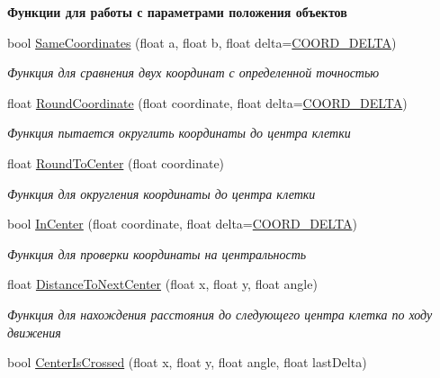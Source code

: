 \begin{Indent}\textbf{ Функции для работы с параметрами положения объектов}\par
\begin{DoxyCompactItemize}
\item 
bool \hyperlink{namespacertm_aa633b82b63b7cff4e9b08bf6a05ec383}{Same\+Coordinates} (float a, float b, float delta=\hyperlink{namespacertm_a9ae158a8873bdf59aa9872cdada6c657}{C\+O\+O\+R\+D\+\_\+\+D\+E\+L\+TA})
\begin{DoxyCompactList}\small\item\em Функция для сравнения двух координат с определенной точностью \end{DoxyCompactList}\item 
float \hyperlink{namespacertm_a511bf31b8bfc36474baaf915bc11a619}{Round\+Coordinate} (float coordinate, float delta=\hyperlink{namespacertm_a9ae158a8873bdf59aa9872cdada6c657}{C\+O\+O\+R\+D\+\_\+\+D\+E\+L\+TA})
\begin{DoxyCompactList}\small\item\em Функция пытается округлить координаты до центра клетки \end{DoxyCompactList}\item 
float \hyperlink{namespacertm_aa2d382c50aa6366b09deaa529d1b3199}{Round\+To\+Center} (float coordinate)
\begin{DoxyCompactList}\small\item\em Функция для округления координаты до центра клетки \end{DoxyCompactList}\item 
bool \hyperlink{namespacertm_a030416c27fb4a5896aad3d102083897f}{In\+Center} (float coordinate, float delta=\hyperlink{namespacertm_a9ae158a8873bdf59aa9872cdada6c657}{C\+O\+O\+R\+D\+\_\+\+D\+E\+L\+TA})
\begin{DoxyCompactList}\small\item\em Функция для проверки координаты на центральность \end{DoxyCompactList}\item 
float \hyperlink{namespacertm_aa546266dce0a8d2a50a7fe311e514668}{Distance\+To\+Next\+Center} (float x, float y, float angle)
\begin{DoxyCompactList}\small\item\em Функция для нахождения расстояния до следующего центра клетка по ходу движения \end{DoxyCompactList}\item 
bool \hyperlink{namespacertm_a69199b6d204d2ebf33b76e5a7ad52876}{Center\+Is\+Crossed} (float x, float y, float angle, float last\+Delta)

\end{DoxyCompactItemize}
\end{Indent}
